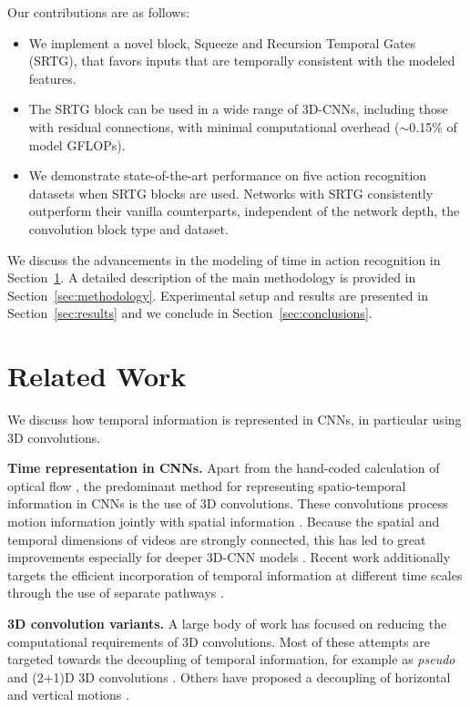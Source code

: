 \documentclass[final,5p,times,twocolumn]{elsarticle}
\begin{document}
Our contributions are as follows:
\vspace{-1mm}
\begin{itemize}
    \item We implement a novel block, Squeeze and Recursion Temporal Gates (SRTG), that favors inputs that are temporally consistent with the modeled features.
    
    \item The SRTG block can be used in a wide range of 3D-CNNs, including those with residual connections, with minimal computational overhead ($\sim$0.15\% of model GFLOPs).

    \item We demonstrate state-of-the-art performance on five action recognition datasets when SRTG blocks are used. Networks with SRTG consistently outperform their vanilla counterparts, independent of the network depth, the convolution block type and dataset.
    
\end{itemize}

We discuss the advancements in the modeling of time in action recognition in Section~\ref{sec:related}. A detailed description of the main methodology is provided in Section~\ref{sec:methodology}. Experimental setup and results are presented in Section~\ref{sec:results} and we conclude in Section~\ref{sec:conclusions}.



\section{Related Work}
\label{sec:related}
We discuss how temporal information is represented in CNNs, in particular using 3D convolutions.

\textbf{Time representation in CNNs.} Apart from the hand-coded calculation of optical flow \citep{simonyan2014two}, the predominant method for representing spatio-temporal information in CNNs is the use of 3D convolutions. These convolutions process motion information jointly with spatial information \citep{ji20133d}. Because the spatial and temporal dimensions of videos are strongly connected, this has led to great improvements especially for deeper 3D-CNN models \citep{carreira2017quo,hara2018can}. Recent work additionally targets the efficient incorporation of temporal information at different time scales through the use of separate pathways \citep{chen2018multifiber,feichtenhofer2019slowfast}.

\textbf{3D convolution variants.} A large body of work has focused on reducing the computational requirements of 3D convolutions. Most of these attempts are targeted towards the decoupling of temporal information, for example as \textit{pseudo} and (2+1)D 3D convolutions \citep{qiu2017learning,tran2018closer}. Others have proposed a decoupling of horizontal and vertical motions \citep{stergiou2019FAST}.
\end{document}

